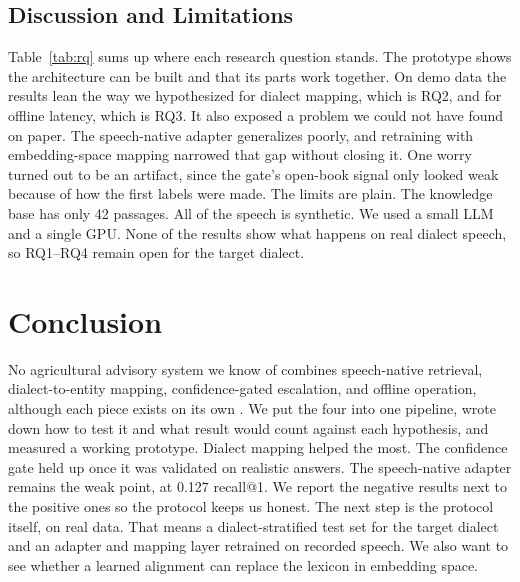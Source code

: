 \documentclass[conference]{IEEEtran}
\begin{document}
\subsection{Discussion and Limitations}
Table~\ref{tab:rq} sums up where each research question stands. The prototype shows the architecture can be built and that its parts work together. On demo data the results lean the way we hypothesized for dialect mapping, which is RQ2, and for offline latency, which is RQ3. It also exposed a problem we could not have found on paper. The speech-native adapter generalizes poorly, and retraining with embedding-space mapping narrowed that gap without closing it. One worry turned out to be an artifact, since the gate's open-book signal only looked weak because of how the first labels were made. The limits are plain. The knowledge base has only 42 passages. All of the speech is synthetic. We used a small LLM and a single GPU. None of the results show what happens on real dialect speech, so RQ1--RQ4 remain open for the target dialect.

\section{Conclusion}\label{sec:concl}
No agricultural advisory system we know of combines speech-native retrieval, dialect-to-entity mapping, confidence-gated escalation, and offline operation, although each piece exists on its own \cite{min2025speechrag,google2025s2r,liu2025colloquialpest,hossain2026bengalirag,abstinence2025,dubey2025aahar}. We put the four into one pipeline, wrote down how to test it and what result would count against each hypothesis, and measured a working prototype. Dialect mapping helped the most. The confidence gate held up once it was validated on realistic answers. The speech-native adapter remains the weak point, at 0.127 recall@1. We report the negative results next to the positive ones so the protocol keeps us honest. The next step is the protocol itself, on real data. That means a dialect-stratified test set for the target dialect and an adapter and mapping layer retrained on recorded speech. We also want to see whether a learned alignment can replace the lexicon in embedding space.



\end{document}
